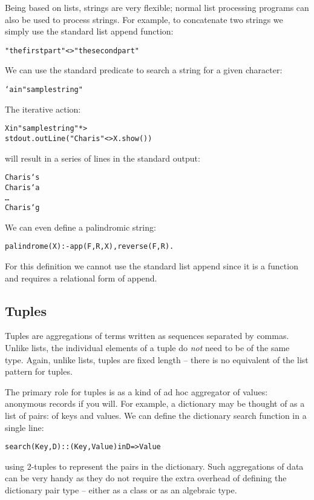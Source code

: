 Being based on lists, \go strings are very flexible; normal list processing programs can also be used to process strings. For example, to concatenate two strings we simply use the standard list append function:
\begin{alltt}
"the first part"<>" the second part"
\end{alltt}
We can use the standard  predicate to search a string for a given character:
\begin{alltt}
`a in "sample string"
\end{alltt}
The iterative action:
\begin{alltt}
X in "sample string" *>
  stdout.outLine("Char is "<>X.show())
\end{alltt}
will result in a series of lines in the standard output:
\begin{alltt}
Char is `s
Char is `a
\ldots
Char is `g
\end{alltt}
We can even define a palindromic string:
\begin{alltt}
palindrome(X) :- app(F,R,X), reverse(F,R).
\end{alltt}
For this definition we cannot use the standard list append \q{<>} since it is a function and  requires a relational form of append. 

\subsection{Tuples}
\label{expression:tuples}

Tuples are aggregations of terms written as sequences separated by commas. Unlike lists, the individual elements of a tuple do \emph{not} need to be of the same type. Again, unlike lists, tuples are fixed length -- there is no equivalent of the list pattern for tuples.

The primary role for tuples is as a kind of ad hoc aggregator of values: anonymous records if you will. For example, a dictionary may be thought of as a list of pairs: of keys and values. We can define the dictionary search function in a single line:
\begin{alltt}
search(Key,D)::(Key,Value) in D => Value
\end{alltt}
using 2-tuples to represent the pairs in the dictionary. Such aggregations of data can be very handy as they do not require the extra overhead of defining the dictionary pair type -- either as a class or as an algebraic type.

